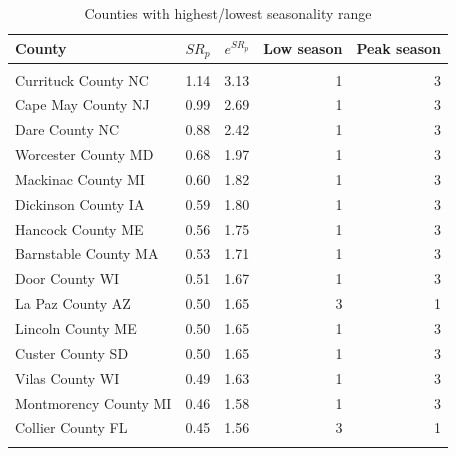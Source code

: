 \documentclass[]{article}
\begin{document}
\begin{table}

\caption{\label{tab:table_seasonality_county}Counties with highest/lowest seasonality range}
\centering
\begin{tabular}[t]{lrrrr}
\toprule
County & $SR_p$ & $e^{SR_p}$ & Low season & Peak season\\
\midrule
\addlinespace[0.3em]
\multicolumn{5}{l}{\textbf{Highest $SR_p$}}\\
\hspace{1em}Currituck County NC & 1.14 & 3.13 & 1 & 3\\
\hspace{1em}Cape May County NJ & 0.99 & 2.69 & 1 & 3\\
\hspace{1em}Dare County NC & 0.88 & 2.42 & 1 & 3\\
\hspace{1em}Worcester County MD & 0.68 & 1.97 & 1 & 3\\
\hspace{1em}Mackinac County MI & 0.60 & 1.82 & 1 & 3\\
\hspace{1em}Dickinson County IA & 0.59 & 1.80 & 1 & 3\\
\hspace{1em}Hancock County ME & 0.56 & 1.75 & 1 & 3\\
\hspace{1em}Barnstable County MA & 0.53 & 1.71 & 1 & 3\\
\hspace{1em}Door County WI & 0.51 & 1.67 & 1 & 3\\
\hspace{1em}La Paz County AZ & 0.50 & 1.65 & 3 & 1\\
\hspace{1em}Lincoln County ME & 0.50 & 1.65 & 1 & 3\\
\hspace{1em}Custer County SD & 0.50 & 1.65 & 1 & 3\\
\hspace{1em}Vilas County WI & 0.49 & 1.63 & 1 & 3\\
\hspace{1em}Montmorency County MI & 0.46 & 1.58 & 1 & 3\\
\hspace{1em}Collier County FL & 0.45 & 1.56 & 3 & 1\\
\addlinespace[0.3em]
\multicolumn{5}{l}{\textbf{Lowest $SR_p$}}\\

\end{tabular}
\end{table}
\end{document}
